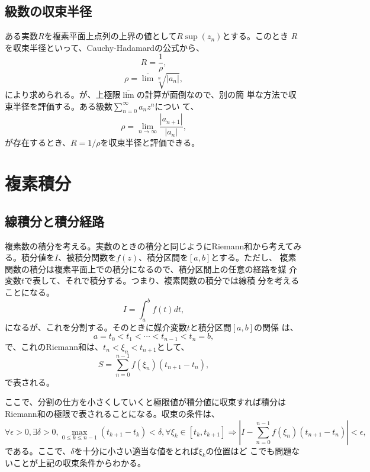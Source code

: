\subsection{級数の収束半径}
ある実数$R$を複素平面上点列の上界の値として$R\sup (z_n)$とする。このとき
$R$を収束半径といって、Cauchy-Hadamardの公式から、
\begin{equation}
 R = \frac{1}{\rho},
\end{equation}
\begin{equation}
 \rho = \overline{\lim}\sqrt[n]{\left|a_n\right|},
\end{equation}
により求められる。が、上極限$\overline{\lim}$の計算が面倒なので、別の簡
単な方法で収束半径を評価する。ある級数$\sum_{n=0}^{\infty}a_nz^n$につい
て、
\begin{equation}
 \rho = \lim_{n\to\infty}\frac{\left|a_{n+1}\right|}{\left|a_n\right|},
\end{equation}
が存在するとき、$R=1/\rho$を収束半径と評価できる。

\section{複素積分}
\subsection{線積分と積分経路}
複素数の積分を考える。実数のときの積分と同じようにRiemann和から考えてみ
る。積分値を$I$、被積分関数を$f(z)$、積分区間を$[a ,b]$とする。ただし、
複素関数の積分は複素平面上での積分になるので、積分区間上の任意の経路を媒
介変数$t$で表して、それで積分する。つまり、複素関数の積分では線積
分を考えることになる。
\begin{equation}
 I = \int_{a}^{b} f(t) dt,
\end{equation}
になるが、これを分割する。そのときに媒介変数$t$と積分区間$[a, b]$の関係
は、
\begin{equation}
 a = t_0 < t_1 < \cdots < t_{n-1} < t_n = b,
\end{equation}
で、これのRiemann和は、$t_n < \xi_n < t_{n+1}$として、
\begin{equation}
 S = \sum_{n=0}^{n-1} f(\xi_n) (t_{n+1} - t_n),
\end{equation}
で表される。

ここで、分割の仕方を小さくしていくと極限値が積分値に収束すれば積分は
Riemann和の極限で表されることになる。収束の条件は、
\begin{equation}
 \forall\epsilon > 0, \exists\delta > 0, 
  \max_{0\leq k\leq n-1} (t_{k+1} - t_k) < \delta, 
  \forall \xi_k \in [t_k, t_{k+1}]
  \Rightarrow
  \left|I - \sum_{n=0}^{n-1} f(\xi_n) (t_{n+1} - t_n) \right| < \epsilon,
\end{equation}
である。ここで、$\delta$を十分に小さい適当な値をとれば$\xi_k$の位置はど
こでも問題ないことが上記の収束条件からわかる。

